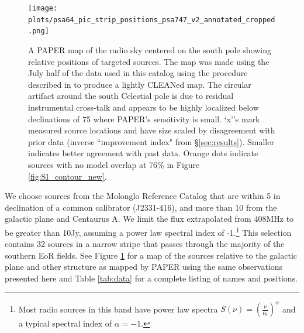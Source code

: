 \documentclass[preprint]{aastex}
\begin{document}
\begin{figure}
\texttt{[image: plots/psa64\_pic\_strip\_positions\_psa747\_v2\_annotated\_cropped.png]}
\caption{
A PAPER map of the radio sky centered on the south pole showing relative positions of targeted sources. The map was made using the July half of the
data used in this catalog using the procedure described in \citet{Jacobs:2011p8438} to produce a lightly CLEANed map. The circular artifact around the south Celestial pole is due to residual instrumental cross-talk and appears to be highly localized below declinations of 75\arcdeg{} where PAPER's sensitivity is small.  `x''s mark measured source locations and have size
scaled by disagreement with prior data (inverse ``improvement index" from 
\S\ref{sec:results}). Smaller indicates better agreement with past data.  Orange dots indicate sources with no model overlap at 76\% in Figure \ref{fig:SI_contour_new}. 
\label{fig:error_map}
}
\end{figure}
%
%
%
%
%
%

We choose sources from the Molonglo
Reference Catalog \cite[MRC]{Large:1981p7798} that are within 5\arcdeg{}  in
declination of a common calibrator (J2331-416), and more than 10\arcdeg{} from the galactic plane and
Centaurus A. We limit the flux extrapolated
from 408MHz to be greater than 10Jy, assuming a power law spectral index of
-1.\footnote{Most radio sources in this band have power law spectra $S(\nu) =
\left(\frac{\nu}{\nu_0}\right)^\alpha$ and a typical spectral index of $\alpha = -1$. } This selection contains 32 sources in a narrow
stripe that passes through the majority of the southern EoR fields. See Figure \ref{fig:error_map} 
for a map of the sources relative to the galactic plane and other structure as mapped by PAPER using the 
same observations presented here
and Table \ref{tab:data} for a complete listing of names and positions.
\end{document}
